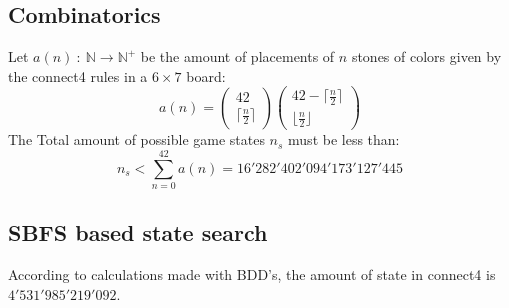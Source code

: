 \documentclass[12pt]{article}
\begin{document}
\subsection{Combinatorics}
Let \(a(n)~:~\mathbb N \to \mathbb N^+\) be the amount of placements of \(n\) stones of colors given by the connect4 rules in a \(6\times 7\) board:
\begin{equation}
a(n) = \left(\begin{matrix}
42\\
\lceil\frac{n}{2}\rceil
\end{matrix}\right)
\left(\begin{matrix}
42-\lceil\frac{n}{2}\rceil\\
\lfloor\frac{n}{2}\rfloor
\end{matrix}\right)
\end{equation}
The Total amount of possible game states \(n_s\) must be less than:
\begin{equation}
n_s < \sum_{n=0}^{42} a(n) = 16'282'402'094'173'127'445
\end{equation}
\subsection {SBFS based state search}
According to calculations made with BDD's, the amount of state in connect4 is \(4'531'985'219'092\).\cite{kissmann_2016}
\end{document}

